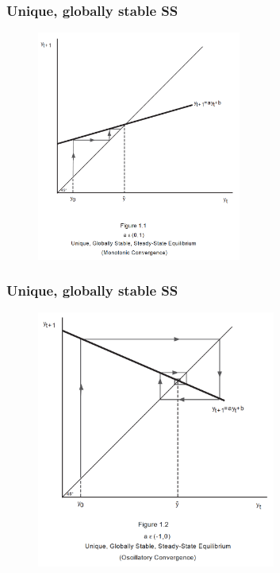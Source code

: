 \documentclass[11pt]{beamer}
\begin{document}

\begin{frame}
\frametitle{Unique, globally stable SS}
{\begin{figure}
\centering
\includegraphics[width = 0.6\textwidth]{./images/fig1}
\end{figure}}
\end{frame}


\begin{frame}
\frametitle{Unique, globally stable SS}
{\begin{figure}
\centering
\includegraphics[width = 0.7\textwidth]{./images/fig2}
\end{figure}}
\end{frame}
\end{document}

